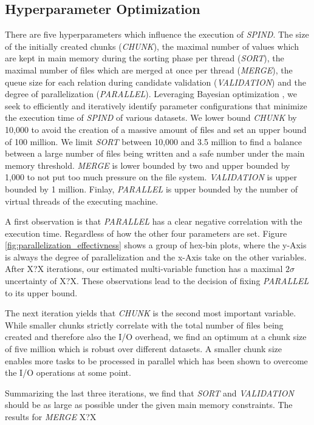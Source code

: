 \subsection{Hyperparameter Optimization}
There are five hyperparameters which influence the execution of \textit{SPIND}. The size of the initially created chunks (\textit{CHUNK}), the maximal number of values which are kept in main memory during the sorting phase per thread (\textit{SORT}), the maximal number of files which are merged at once per thread (\textit{MERGE}), the queue size for each relation during candidate validation (\textit{VALIDATION}) and the degree of parallelization (\textit{PARALLEL}). Leveraging Bayesian optimization \cite{shahriari2015taking}, we seek to efficiently and iteratively identify parameter configurations that minimize the execution time of \textit{SPIND} of various datasets. We lower bound \textit{CHUNK} by 10,000 to avoid the creation of a massive amount of files and set an upper bound of 100 million. We limit \textit{SORT} between 10,000 and 3.5 million to find a balance between a large number of files being written and a safe number under the main memory threshold. \textit{MERGE} is lower bounded by two and upper bounded by 1,000 to not put too much pressure on the file system. \textit{VALIDATION} is upper bounded by 1 million. Finlay, \textit{PARALLEL} is upper bounded by the number of virtual threads of the executing machine.

A first observation is that \textit{PARALLEL} has a clear negative correlation with the execution time. Regardless of how the other four parameters are set. Figure \ref{fig:parallelization_effectivness} shows a group of hex-bin plots, where the y-Axis is always the degree of parallelization and the x-Axis take on the other variables. After X?X iterations, our estimated multi-variable function has a maximal $2\sigma$ uncertainty of X?X. These observations lead to the decision of fixing \textit{PARALLEL} to its upper bound.

The next iteration yields that \textit{CHUNK} is the second most important variable. While smaller chunks strictly correlate with the total number of files being created and therefore also the I/O overhead, we find an optimum at a chunk size of five million which is robust over different datasets. A smaller chunk size enables more tasks to be processed in parallel which has been shown to overcome the I/O operations at some point.

Summarizing the last three iterations, we find that \textit{SORT} and \textit{VALIDATION} should be as large as possible under the given main memory constraints. The results for \textit{MERGE} X?X %

